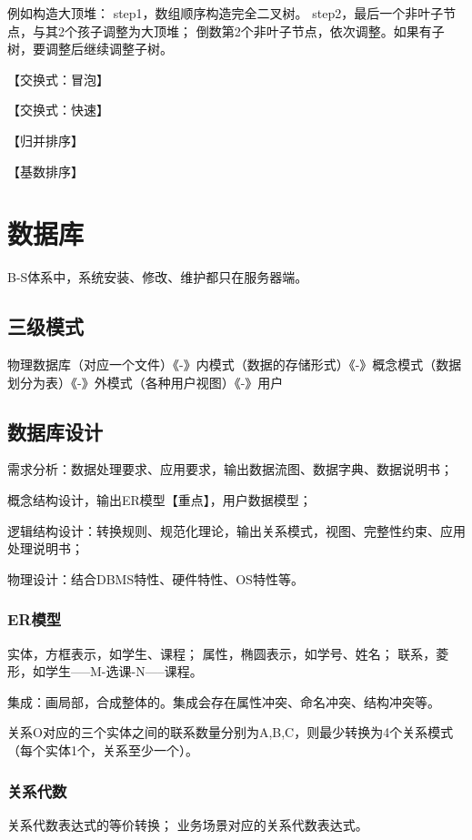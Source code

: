 \documentclass[UTF8]{article}
\begin{document}
例如构造大顶堆：
step1，数组顺序构造完全二叉树。
step2，最后一个非叶子节点，与其2个孩子调整为大顶堆；
       倒数第2个非叶子节点，依次调整。如果有子树，要调整后继续调整子树。
       




【交换式：冒泡】

【交换式：快速】



【归并排序】

【基数排序】


\section{数据库}
B-S体系中，系统安装、修改、维护都只在服务器端。

\subsection{三级模式}
物理数据库（对应一个文件）《-》内模式（数据的存储形式）《-》概念模式（数据划分为表）《-》外模式（各种用户视图）《-》用户

\subsection{数据库设计}
需求分析：数据处理要求、应用要求，输出数据流图、数据字典、数据说明书；

概念结构设计，输出ER模型【重点】，用户数据模型；

逻辑结构设计：转换规则、规范化理论，输出关系模式，视图、完整性约束、应用处理说明书；

物理设计：结合DBMS特性、硬件特性、OS特性等。

\subsubsection{ER模型}
实体，方框表示，如学生、课程；
属性，椭圆表示，如学号、姓名；
联系，菱形，如学生-----M-选课-N-----课程。

集成：画局部，合成整体的。集成会存在属性冲突、命名冲突、结构冲突等。

关系O对应的三个实体之间的联系数量分别为A,B,C，则最少转换为4个关系模式（每个实体1个，关系至少一个）。

\subsubsection{关系代数}

关系代数表达式的等价转换；
业务场景对应的关系代数表达式。
\end{document}
